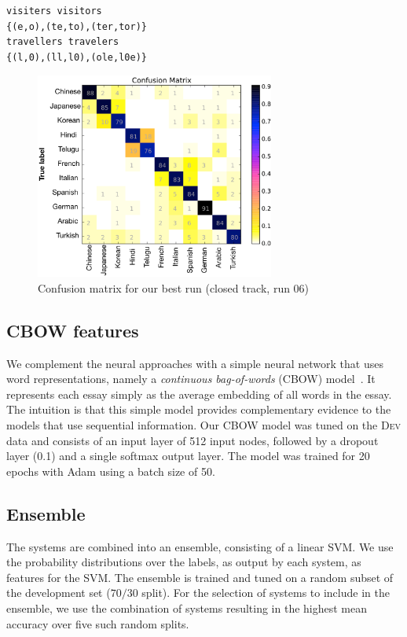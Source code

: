 \documentclass[11pt,letterpaper]{article}
\begin{document}
\begin{verbatim}
visiters visitors 
{(e,o),(te,to),(ter,tor)} 
travellers travelers 
{(l,0),(ll,l0),(ole,l0e)}
\end{verbatim}  

\begin{figure}[h]
\centering
\includegraphics[width=0.7\textwidth]{confusion_matrix_run06closed}
\caption{Confusion matrix for our best run (closed track, run 06)}
\label{fig:conf_mat}
\end{figure}

\subsection{CBOW features}
We complement the neural approaches with a simple neural network that uses word representations, namely a \textit{continuous bag-of-words} (CBOW)  model~\cite{mikolov2013efficient}. It represents each essay simply as the average embedding of all words in the essay. The intuition is that this simple model provides complementary evidence to the models  that use sequential information. Our CBOW model was tuned on the \textsc{Dev} data and consists of an input layer of 512 input nodes, followed by a dropout layer (0.1) and a single softmax output layer. The model was trained for 20 epochs with Adam using a batch size of 50.

\subsection{Ensemble}
The systems are combined into an ensemble, consisting of a linear SVM.
We use the probability distributions over the labels, as output by each system, as features for the SVM.
The ensemble is trained and tuned on a random subset of the development set ($70/30$ split).
For the selection of systems to include in the ensemble, we use the combination of systems resulting in the highest mean accuracy over five such random splits.
\end{document}
